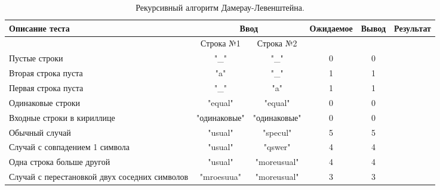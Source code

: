 \documentclass[12pt]{report}
\begin{document}
    \begin{table}
    	\caption{\label{tab:test1} Рекурсивный алгоритм Дамерау-Левенштейна.}
    	\begin{center}
    		\begin{tabular}{|p{2.5cm}|c|c|c|c|c|}
    			\hline
    			  Описание теста & \multicolumn{2}{|c|}{Ввод} & Ожидаемое & Вывод & Результат\\
    			\hline
    			& Строка №1 & Строка №2 & & & \\
    			\hline
			   Пустые строки & "\_" & "\_" & 0 & 0 & \checkmark\\
			   \hline
   			   Вторая строка пуста & "a" & "\_" & 1 & 1 & \checkmark\\
   			   \hline
			   Первая строка пуста & "\_" & "a" & 1 & 1 & \checkmark\\
			   \hline
			   Одинаковые строки & "equal" & "equal" & 0 & 0 & \checkmark\\
			   \hline
			   Входные строки в кириллице & "одинаковые" & "одинаковые" & 0 & 0 & \checkmark\\
			   \hline
			   Обычный случай & "usual" & "specul" & 5 & 5 & \checkmark\\
			   \hline
			   Случай с совпадением 1 символа & "usual" & "qswer" & 4 & 4 & \checkmark\\
			   \hline
			   Одна строка больше другой & "usual" & "moreusual" & 4 & 4 & \checkmark\\
			   \hline
			   Случай с перестановкой двух соседних символов & "mroesuua" & "moreusual" & 3 & 3 & \checkmark\\
			   \hline
    		\end{tabular}
    	\end{center}
    \end{table}
\end{document}
